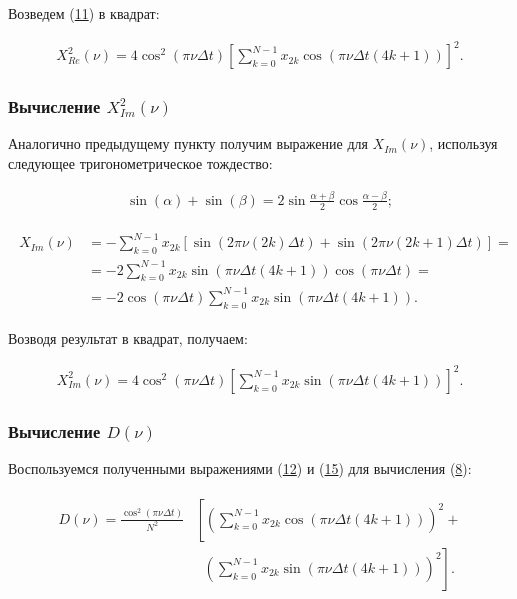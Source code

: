 \documentclass[12pt]{article}
\newcommand{\hl}[1]{(\hyperlink{eq:#1}{#1})}
\newcommand{\s}[2]{\hypertarget{skip:#1}{\vspace{#2pt}}}
\newcommand{\sd}[1]{\hypertarget{skip:#1}{\vspace{-10pt}}}
\newcommand{\hep}[2]{\vspace{#2pt}\hypertarget{eq:#1}{}\vspace{-#2pt}}
\newcommand{\hs}[1]{\sd{#1}\hep{#1}{18}}
\begin{document}
Возведем \hl{11} в квадрат:

\sd{12}\hep{12}{20}
\begin{gather}
    X_{Re}^2(\nu) = 4 \cos^2(\pi \nu \Delta t) \left[ \sum_{k = 0}^{N - 1} x_{2 k} \cos(\pi \nu \Delta t (4 k + 1) ) \right]^2.
\end{gather}

\subsubsection{Вычисление $ X_{Im}^2(\nu) $}

Аналогично предыдущему пункту получим выражение для $ X_{Im}(\nu) $, используя следующее тригонометрическое тождество:

\sd{13}
\begin{gather}
    \sin(\alpha) + \sin(\beta) = 2 \sin \frac{\alpha + \beta}{2} \cos \frac{\alpha - \beta}{2};
\end{gather}

\s{14}{-20}
\begin{gather}
    \begin{split}
    X_{Im}(\nu) &= - \sum_{k = 0}^{N - 1} x_{2 k} [ \sin(2 \pi \nu (2 k) \Delta t) + \sin(2 \pi \nu (2 k + 1) \Delta t) ] = \\
    &= - 2 \sum_{k = 0}^{N - 1} x_{2 k} \sin(\pi \nu \Delta t (4k + 1)) \cos(\pi \nu \Delta t) = \\
    &= - 2 \cos(\pi \nu \Delta t) \sum_{k = 0}^{N - 1} x_{2 k} \sin(\pi \nu \Delta t (4k + 1)).
    \end{split}
\end{gather}

Возводя результат в квадрат, получаем:

\hs{15}
\begin{gather}
    X_{Im}^2(\nu) = 4 \cos^2(\pi \nu \Delta t) \left[ \sum_{k = 0}^{N - 1} x_{2 k} \sin(\pi \nu \Delta t (4 k + 1) ) \right]^2.
\end{gather}

\subsubsection{Вычисление $ D(\nu) $}

Воспользуемся полученными выражениями \hl{12} и \hl{15} для вычисления \hl{8}:

\hs{16}
\begin{gather}
\begin{split}
    D(\nu) = \frac{\cos^2(\pi \nu \Delta t)}{N^2} & \left[ \left( \sum_{k = 0}^{N - 1} x_{2 k} \cos(\pi \nu \Delta t (4 k + 1)) \right)^2 + \right. \\
    & \hspace{7pt} \left. \left( \sum_{k = 0}^{N - 1} x_{2 k} \sin(\pi \nu \Delta t (4 k + 1)) \right)^2\right].
\end{split}
\end{gather}
\end{document}
